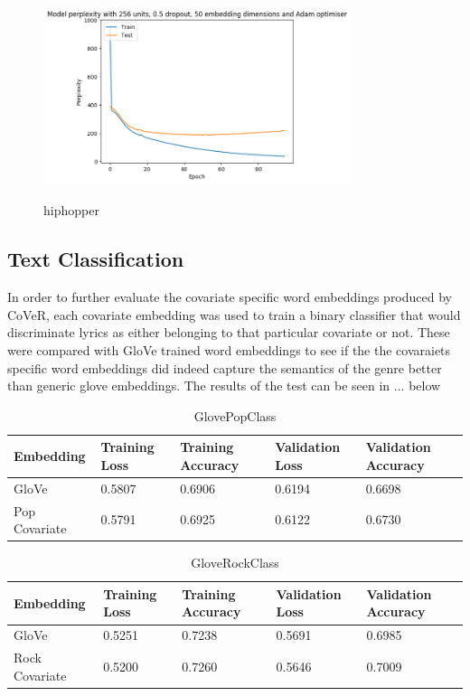 \begin{figure}[h]
	\includegraphics[width=9cm, height=6cm]{./figures/hiphopper}
	\centering
	\caption{hiphopper}
	\label{fig:popper}
\end{figure}

\noindent
\newline


\subsection{Text Classification}
In order to further evaluate the covariate specific word embeddings produced by CoVeR, each covariate embedding was used to train a binary classifier that would discriminate lyrics as either belonging to that particular covariate or not. These were compared with GloVe trained word embeddings to see if the the covaraiets specific word embeddings did indeed capture the semantics of the genre better than generic glove embeddings. The results of the test can be seen in ... below

\begin{table}[ht]
	\centering
	\begin{tabular}{ | p{3cm} | p{2cm} | p{2cm} | p{2cm} | p{2cm} |}
		\hline
		\textbf{Embedding} & \textbf{Training Loss} & \textbf{Training Accuracy} & \textbf{Validation Loss} & \textbf{Validation Accuracy}\\ \hline
		GloVe & 0.5807 & 0.6906 & 0.6194 & 0.6698\\ \hline
		Pop Covariate & 0.5791 & 0.6925 & 0.6122 & 0.6730\\ \hline
	\end{tabular}
	\label{Tab:GlovePopClass}
	\caption{GlovePopClass}
\end{table}

\begin{table}[ht]
	\centering
	\begin{tabular}{ | p{3cm} | p{2cm} | p{2cm} | p{2cm} | p{2cm} |}
		\hline
		\textbf{Embedding} & \textbf{Training Loss} & \textbf{Training Accuracy} & \textbf{Validation Loss} & \textbf{Validation Accuracy}\\ \hline
		GloVe & 0.5251 & 0.7238 & 0.5691 & 0.6985\\ \hline
		Rock Covariate & 0.5200 & 0.7260 & 0.5646 & 0.7009\\ \hline
	\end{tabular}
	\label{Tab:GloveRockClass}
	\caption{GloveRockClass}
\end{table}


